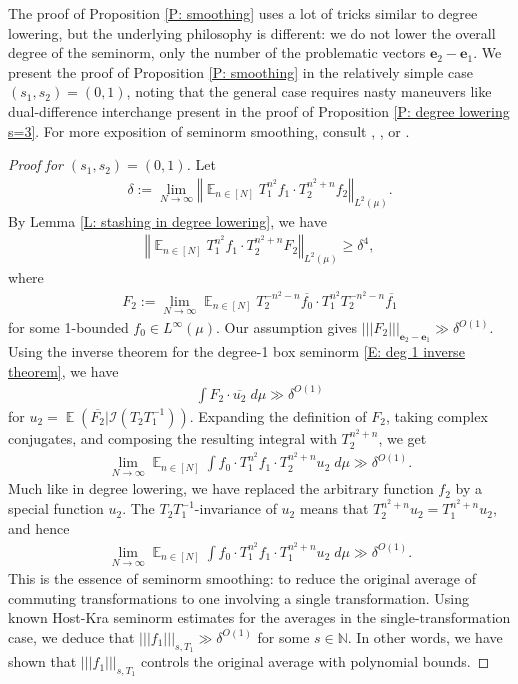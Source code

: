 \documentclass[11pt]{amsart}
\theoremstyle{definition}
\DeclareMathOperator*{\E}{\mathbb{E}}
\newcommand{\N}{{\mathbb N}}
\newcommand{\CI}{{\mathcal I}}
\newcommand{\be}{{\mathbf{e}}}
\newcommand{\norm}[1]{\left\Vert #1\right\Vert}
\newcommand{\nnorm}[1]{\lvert\!|\!| #1|\!|\!\rvert}
\newcommand{\inv}{^{-1}}
\newcommand{\1}{{\mathbf{1}}}
\begin{document}
The proof of Proposition \ref{P: smoothing} uses a lot of tricks similar to degree lowering, but the underlying philosophy is different: we do not lower the overall degree of the seminorm, only the number of the problematic vectors $\be_2-\be_1$. We present the proof of Proposition \ref{P: smoothing} in the relatively simple case $(s_1, s_2) = (0,1)$, noting that the general case requires nasty maneuvers like dual-difference interchange present in the proof of Proposition \ref{P: degree lowering s=3}. For more exposition of seminorm smoothing, consult \cite[Section 8]{FrKu22a}, \cite[Section 4]{FrKu22b}, or \cite[Section 4.2]{DKKST25}.
\begin{proof}[Proof for $(s_1, s_2) = (0,1)$]
    Let 
    \begin{align}\label{E: smoothing beginning}
        \delta := \lim_{N\to\infty}\norm{\E_{n\in[N]}T_1^{n^2}f_1\cdot T_2^{n^2+n}f_2}_{L^2(\mu)}.
    \end{align}
    By Lemma \ref{L: stashing in degree lowering}, we have
    \begin{align*}
        \norm{\E_{n\in[N]}T_1^{n^2}f_1\cdot T_2^{n^2+n}F_2}_{L^2(\mu)}\geq \delta^4,
    \end{align*}
    where 
    \begin{align*}
        F_2 :=\lim_{N\to\infty}\E_{n\in[N]}T_2^{-n^2-n}\overline{f_0}\cdot T_1^{n^2}T_2^{-n^2-n}\overline{f_1}
    \end{align*}
    for some 1-bounded $f_0\in L^\infty(\mu)$.
    Our assumption gives $\nnorm{F_2}_{\be_2-\be_1}\gg \delta^{O(1)}.$ Using the inverse theorem for the degree-1 box seminorm \eqref{E: deg 1 inverse theorem}, we have %
    \begin{align*}
        \int F_2\cdot \overline{u_2}\; d\mu \gg \delta^{O(1)}
    \end{align*}
    for $u_2 =\E(\overline{F_2}|\CI(T_2T_1\inv))$.
    Expanding the definition of $F_2$, taking complex conjugates, and composing the resulting integral with $T_2^{n^2 + n}$, we get 
    \begin{align*}
        \lim_{N\to\infty}\E_{n\in[N]}\int f_0 \cdot T_1^{n^2}f_1\cdot T_2^{n^2+n}u_2\; d\mu \gg \delta^{O(1)}.
    \end{align*}
    Much like in degree lowering, we have replaced the arbitrary function $f_2$ by a special function $u_2$. The $T_2T_1\inv$-invariance of $u_2$ means that $T_2^{n^2+n}u_2 = T_1^{n^2+n}u_2$, and hence
    \begin{align*}
        \lim_{N\to\infty}\E_{n\in[N]}\int f_0 \cdot T_1^{n^2}f_1\cdot T_1^{n^2+n}u_2\; d\mu \gg \delta^{O(1)}.
    \end{align*}
    This is the essence of seminorm smoothing: to reduce the original average of commuting transformations to one involving a single transformation. Using known Host-Kra seminorm estimates for the averages in the single-transformation case, we deduce that $\nnorm{f_1}_{s, T_1} \gg \delta^{O(1)}$ for some $s\in\N$. In other words, we have shown that $\nnorm{f_1}_{s, T_1}$ controls the original average with polynomial bounds.


\end{proof}
\end{document}
